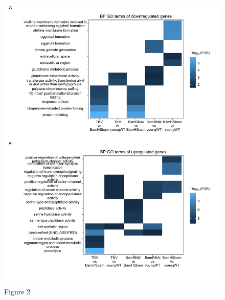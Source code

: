 \documentclass[
]{article}
\begin{document}
\begin{figure}
\centering
\includegraphics{Figure2.pdf}
\caption{Figure 2}
\end{figure}
\end{document}

